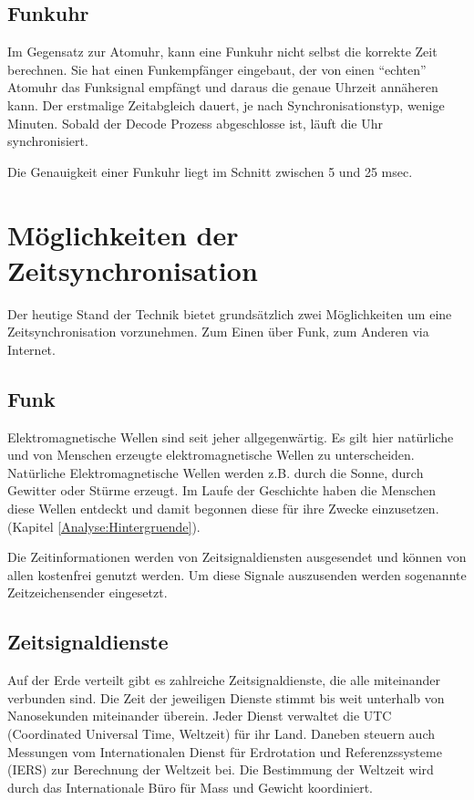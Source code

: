 \subsection{Funkuhr}
Im Gegensatz zur Atomuhr, kann eine Funkuhr nicht selbst die korrekte Zeit berechnen. Sie hat einen Funkempfänger eingebaut, der von einen "`echten"' Atomuhr das Funksignal empfängt und daraus die genaue Uhrzeit annäheren kann. Der erstmalige Zeitabgleich dauert, je nach Synchronisationstyp, wenige Minuten. Sobald der Decode Prozess abgeschlosse ist, läuft die Uhr synchronisiert.

Die Genauigkeit einer Funkuhr liegt im Schnitt zwischen 5 und 25 msec.


\section{Möglichkeiten der Zeitsynchronisation}
Der heutige Stand der Technik bietet grundsätzlich zwei Möglichkeiten um eine Zeitsynchronisation vorzunehmen. Zum Einen über Funk, zum Anderen via Internet.

\subsection{Funk}
Elektromagnetische Wellen sind seit jeher allgegenwärtig. Es gilt hier natürliche und von Menschen erzeugte elektromagnetische Wellen zu unterscheiden. Natürliche Elektromagnetische Wellen werden z.B. durch die Sonne, durch Gewitter oder Stürme erzeugt. Im Laufe der Geschichte haben die Menschen diese Wellen entdeckt und damit begonnen diese für ihre Zwecke einzusetzen. (Kapitel \ref{Analyse:Hintergruende}).

Die Zeitinformationen werden von Zeitsignaldiensten ausgesendet und können von allen kostenfrei genutzt werden. Um diese Signale auszusenden werden sogenannte Zeitzeichensender eingesetzt. 

\subsection{Zeitsignaldienste}
Auf der Erde verteilt gibt es zahlreiche Zeitsignaldienste, die alle miteinander verbunden sind. Die Zeit der jeweiligen Dienste stimmt bis weit unterhalb von Nanosekunden miteinander überein. Jeder Dienst verwaltet die UTC (Coordinated Universal Time, Weltzeit) für ihr Land. Daneben steuern auch Messungen vom Internationalen Dienst für Erdrotation und Referenzssysteme (IERS) zur Berechnung der Weltzeit bei.
Die Bestimmung der Weltzeit wird durch das Internationale Büro für Mass und Gewicht koordiniert. 

